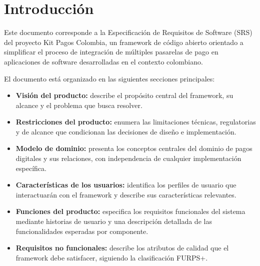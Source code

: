 \documentclass[10pt]{article}
\begin{document}
\Portada

\begin{HistorialDeCambios}
\end{HistorialDeCambios}

\Indices



\section{Introducción}

Este documento corresponde a la Especificación de Requisitos de Software (SRS) del proyecto Kit Pagos Colombia, un framework de código abierto orientado a simplificar el proceso de integración de múltiples pasarelas de pago en aplicaciones de software desarrolladas en el contexto colombiano.

El documento está organizado en las siguientes secciones principales:

\begin{itemize}
  \item \textbf{Visión del producto:} describe el propósito central del framework, su alcance y el problema que busca resolver.
  \item \textbf{Restricciones del producto:} enumera las limitaciones técnicas, regulatorias y de alcance que condicionan las decisiones de diseño e implementación.
  \item \textbf{Modelo de dominio:} presenta los conceptos centrales del dominio de pagos digitales y sus relaciones, con independencia de cualquier implementación específica.
  \item \textbf{Características de los usuarios:} identifica los perfiles de usuario que interactuarán con el framework y describe sus características relevantes.
  \item \textbf{Funciones del producto:} especifica los requisitos funcionales del sistema mediante historias de usuario y una descripción detallada de las funcionalidades esperadas por componente.
  \item \textbf{Requisitos no funcionales:} describe los atributos de calidad que el framework debe satisfacer, siguiendo la clasificación FURPS+.
\end{itemize}
\end{document}
